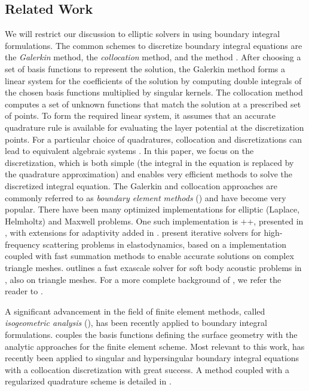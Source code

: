 \subsection{Related Work\label{sec:related_work}}
We will restrict our discussion to elliptic \pde solvers in \threed using boundary integral formulations. 
The common schemes to discretize boundary integral equations are the \textit{Galerkin} method, the \textit{collocation} method, and the \textit{\nystrom} method \cite{atkinson2009numerical}.
After choosing a set of basis functions to represent the solution, the Galerkin method forms a linear system for the coefficients of the solution by computing double integrals of the chosen basis functions multiplied by singular kernels.
The collocation method computes a set of unknown functions that match the solution at a prescribed set of points. 
To form the required linear system, it assumes that an accurate quadrature rule is available for evaluating the layer potential at the discretization points. 
For a particular choice of quadratures, collocation and \nystrom discretizations can lead to equivalent algebraic systems \cite[Chapter 13]{K}. 
In this paper, we focus on the \emph{\nystrom} discretization, which is both simple (the integral in the equation is replaced by the quadrature approximation) and enables very efficient methods to solve the discretized integral equation.
The Galerkin and collocation approaches are commonly referred to as \textit{boundary element methods} (\bem) and have become very popular.
There have been many optimized \bem implementations for elliptic (Laplace, Helmholtz) and Maxwell problems. 
One such implementation is \bem++, presented in \cite{smigaj2015solving}, with extensions for adaptivity added in \cite{bespalov2019adaptive,betcke2019adaptive}.
\cite{chaillat2017fast,chaillat2017theory} present iterative solvers for high-frequency scattering problems in elastodynamics, based on a \bem implementation coupled with fast summation methods to enable accurate solutions on complex triangle meshes.
\cite{abduljabbar2019extreme} outlines a fast exascale \bem solver for soft body acoustic problems in \threed, also on triangle meshes.
For a more complete background of \bem, we refer the reader to \cite{steinbach2007numerical}.

A significant advancement in the field of finite element methods, called \textit{isogeometric analysis} (\iga)\cite{hughes2005isogeometric}, has been recently applied to boundary integral formulations.  
\iga couples the basis functions defining the surface geometry with the analytic approaches for the finite element scheme. 
Most relevant to this work, \iga has recently been applied to singular and hypersingular boundary integral equations with a collocation discretization \cite{taus2016isogeometric} with great success. 
A \nystrom \iga method coupled with a regularized quadrature scheme is detailed in \cite{zechner2016isogeometric}.

